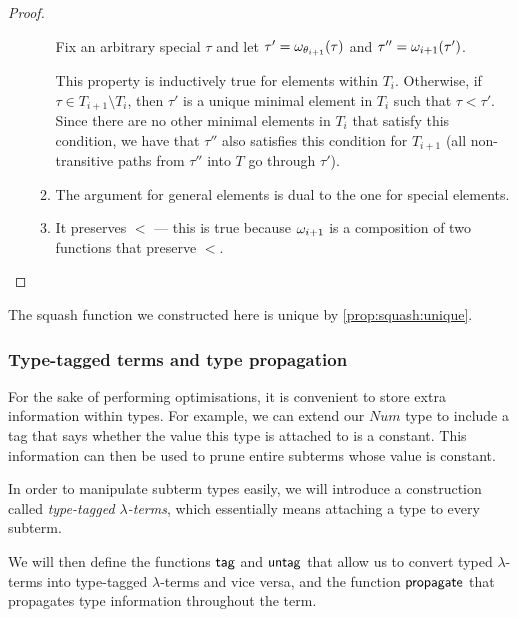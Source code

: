 \documentclass[main.tex]{subfiles}
\begin{document}
\begin{proof}
\begin{itemize}
\begin{enumerate}
                    Fix an arbitrary special $\tau$ and let
                    $\tau' = \omega_{\theta_{i + 1}}(\tau)$ and
                    $\tau'' = \omega_{i + 1}(\tau')$.

                    This property is inductively true for elements within $T_i$.
                    Otherwise, if $\tau \in T_{i + 1} \setminus T_i$, then
                    $\tau'$ is a unique minimal element in
                    $T_i$ such that $\tau \less \tau'$. Since there are no other
                    minimal elements in $T_i$ that satisfy this condition,
                    we have that $\tau''$ also satisfies this condition for
                    $T_{i + 1}$ (all non-transitive paths from $\tau''$ into
                    $T$ go through $\tau'$).

                \item The argument for general elements is dual to the one
                    for special elements.
                \item It preserves $\less$ --- this is true because $\omega_{i + 1}$
                    is a composition of two functions that preserve $\less$.
            \end{enumerate}
    \end{itemize}
\end{proof}

The squash function we constructed here is unique by \cref{prop:squash:unique}.

\subsubsection{Type-tagged terms and type propagation}
\label{sec:propagation}
For the sake of performing optimisations, it is convenient to store extra
information within types. For example, we can extend our $Num$ type to include
a tag that says whether the value this type is attached to is a constant. This
information can then be used to prune entire subterms whose value is constant.

In order to manipulate subterm types easily, we will introduce a construction
called \emph{type-tagged $\lambda$-terms}, which essentially means attaching
a type to every subterm.

We will then define the functions $\mathsf{tag}$ and $\mathsf{untag}$ that allow us
to convert typed $\lambda$-terms into type-tagged $\lambda$-terms and vice
versa, and the function $\mathsf{propagate}$ that propagates type information
throughout the term.
\end{document}

